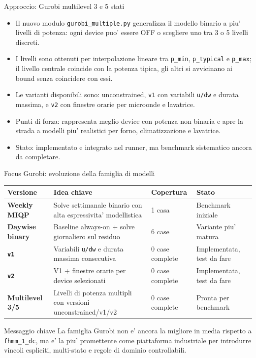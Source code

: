 \documentclass[aspectratio=169]{beamer}
\newcommand{\code}[1]{\texttt{#1}}
\begin{document}
\begin{frame}{Approccio: Gurobi multilevel 3 e 5 stati}
\small
\begin{itemize}
  \item Il nuovo modulo \code{gurobi\_multiple.py} generalizza il modello binario a piu' livelli di potenza: ogni device puo' essere OFF o scegliere uno tra 3 o 5 livelli discreti.
  \item I livelli sono ottenuti per interpolazione lineare tra \code{p\_min}, \code{p\_typical} e \code{p\_max}; il livello centrale coincide con la potenza tipica, gli altri si avvicinano ai bound senza coincidere con essi.
  \item Le varianti disponibili sono: unconstrained, \code{v1} con variabili \code{u/dw} e durata massima, e \code{v2} con finestre orarie per microonde e lavatrice.
  \item Punti di forza: rappresenta meglio device con potenza non binaria e apre la strada a modelli piu' realistici per forno, climatizzazione e lavatrice.
  \item Stato: implementato e integrato nel runner, ma benchmark sistematico ancora da completare.
\end{itemize}
\end{frame}

\begin{frame}{Focus Gurobi: evoluzione della famiglia di modelli}
\scriptsize
\begin{tabularx}{\textwidth}{>{\bfseries}p{}p{}p{}X}
\toprule
Versione & Idea chiave & Copertura & Stato \\
\midrule
Weekly MIQP & Solve settimanale binario con alta espressivita' modellistica & 1 casa & Benchmark iniziale \\
Daywise binary & Baseline always-on + solve giornaliero sul residuo & 6 case & Variante piu' matura \\
\code{v1} & Variabili \code{u/dw} e durata massima consecutiva & 0 case complete & Implementata, test da fare \\
\code{v2} & V1 + finestre orarie per device selezionati & 0 case complete & Implementata, test da fare \\
Multilevel 3/5 & Livelli di potenza multipli con versioni unconstrained/v1/v2 & 0 case complete & Pronta per benchmark \\
\bottomrule
\end{tabularx}

\vspace{0.4em}
\begin{block}{Messaggio chiave}
\scriptsize
La famiglia Gurobi non e' ancora la migliore in media rispetto a \code{fhmm\_1\_dc}, ma e' la piu' promettente come piattaforma industriale per introdurre vincoli espliciti, multi-stato e regole di dominio controllabili.
\end{block}
\end{frame}
\end{document}
